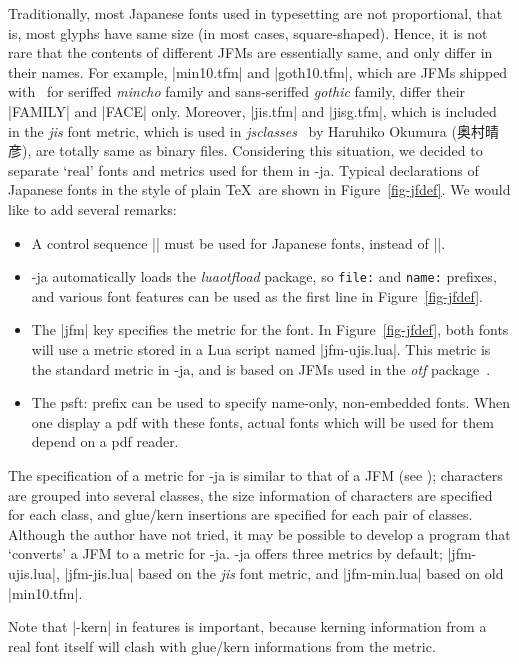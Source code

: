 \documentclass{ajt}
\begin{document}
Traditionally, most Japanese fonts used in typesetting are not
proportional, that is, most glyphs have same size (in most cases,
square-shaped). Hence, it is not rare that the contents of different
JFMs are essentially same, and only differ in their names. For example,
|min10.tfm| and |goth10.tfm|, which are JFMs shipped with \pTeX\ for
seriffed \emph{mincho} family and sans-seriffed \emph{gothic} family,
differ their |FAMILY| and |FACE| only. Moreover, |jis.tfm| and
|jisg.tfm|, which is included in the \emph{jis} font metric, which is
used in \emph{jsclasses}~\cite{jsclasses} by Haruhiko Okumura (奥村晴彦),
are totally same as binary files.  Considering this situation, we
decided to separate `real' fonts and metrics used for them in
\LuaTeX-ja. Typical declarations of Japanese fonts in the style of plain
\TeX\ are shown in Figure~\ref{fig-jfdef}. We would like to add several
remarks:
\begin{itemize}
\item A control sequence |\jfont| must be used for Japanese fonts, instead of |\font|.
\item \LuaTeX-ja automatically loads the \emph{luaotfload} package, so
      \hbox{\tt file:} and \hbox{\tt name:} prefixes, and various font features can be
      used as the first line in Figure~\ref{fig-jfdef}.
\item The |jfm| key specifies the metric for the font. In
      Figure~\ref{fig-jfdef}, both fonts will use a metric stored in a
      Lua script named |jfm-ujis.lua|. This metric is the standard
      metric in \LuaTeX-ja, and is based on JFMs used in the \emph{otf}
      package~\cite{otf}.
\item The \hbox{psft:} prefix can be used to specify name-only, non-embedded
      fonts. When one display a pdf with these fonts, actual fonts which
      will be used for them depend on a pdf reader. 
\end{itemize}
The specification of a metric for \LuaTeX-ja is similar to that of a JFM
(see \cite{ptexjp}); characters are grouped into several classes, the
size information of characters are specified for each class, and
glue/kern insertions are specified for each pair of classes. Although
the author have not tried, it may be possible to develop a program that
`converts' a JFM to a metric for \LuaTeX-ja.  \LuaTeX-ja offers three
metrics by default; |jfm-ujis.lua|, |jfm-jis.lua| based on the
\emph{jis} font metric, and |jfm-min.lua| based on old |min10.tfm|.

 Note that |-kern| in features
is important, because kerning information from a real font itself will
clash with glue/kern informations from the metric.
\end{document}
